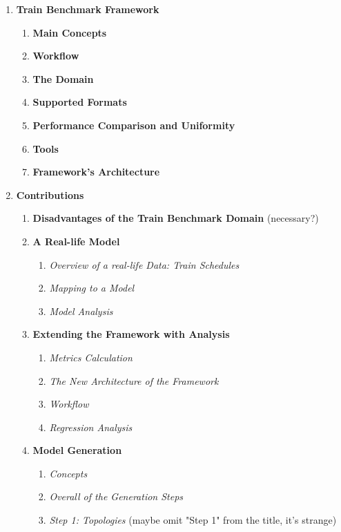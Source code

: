 \begin{enumerate}
	
	
	\item \textbf{Train Benchmark Framework}
	\begin{enumerate}[label*=\arabic*.]
		\item \textbf{Main Concepts}
		\item \textbf{Workflow}
		\item \textbf{The Domain}
		\item \textbf{Supported Formats}
		\item \textbf{Performance Comparison and Uniformity}
		\item \textbf{Tools}
		\item \textbf{Framework's Architecture}
	\end{enumerate}

	
	\item \textbf{Contributions}
	\begin{enumerate}[label*=\arabic*.]
		\item \textbf{Disadvantages of the Train Benchmark Domain} (necessary?)
		\item \textbf{A Real-life Model}
		\begin{enumerate}[label*=\arabic*.]
			\item \textit{Overview of a real-life Data: Train Schedules}
			\item \textit{Mapping to a Model}
			\item \textit{Model Analysis}
		\end{enumerate}
		\item \textbf{Extending the Framework with Analysis}
		\begin{enumerate}[label*=\arabic*.]
			\item \textit{Metrics Calculation}
			\item \textit{The New Architecture of the Framework}
			\item \textit{Workflow}
			\item \textit{Regression Analysis}
		\end{enumerate}
		\item \textbf{Model Generation}
		\begin{enumerate}[label*=\arabic*.]
			\item \textit{Concepts}
			\item \textit{Overall of the Generation Steps}
			\item \textit{Step 1: Topologies} (maybe omit "Step 1" from the title, it's strange)
			\begin{enumerate}[label*=\arabic*.]

\end{enumerate}
\end{enumerate}
\end{enumerate}
\end{enumerate}
